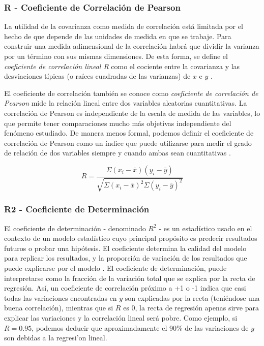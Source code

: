 \subsubsection{R - Coeficiente de Correlación de Pearson}
La utilidad de la covarianza como medida de correlación está limitada por el hecho de que depende de las unidades de medida en que se trabaje. Para construir una medida adimensional de la correlación habrá que dividir la varianza por un término con sus mismas dimensiones. De esta forma, se define el \emph{coeficiente de correlación lineal R} como el cociente entre la covarianza y las desviaciones típicas (o raíces cuadradas de las varianzas) de $x$ e $y$ \cite{estadisticaBasica}. 

El coeficiente de correlación también se conoce como \emph{coeficiente de correlación de Pearson} mide la relación lineal entre dos variables aleatorias cuantitativas. La correlación de Pearson es independiente de la escala de medida de las variables, lo que permite tener comparaciones mucho más objetivas independiente del fenómeno estudiado. De manera menos formal, podemos definir el coeficiente de correlación de Pearson como un índice que puede utilizarse para medir el grado de relación de dos variables siempre y cuando ambas sean cuantitativas \cite{intoStats7}.

\begin{equation}
    R = \frac{\Sigma(x_i - \bar{x})(y_i - \bar{y})}{\sqrt{\Sigma(x_i - \bar{x})^2\Sigma(y_i - \bar{y})^2}}    
\end{equation}

\subsubsection{R2 - Coeficiente de Determinación}
El coeficiente de determinación - denominado \(R^{2}\) - es un estadístico usado en el contexto de un modelo estadístico cuyo principal propósito es predecir resultados futuros o probar una hipótesis. El coeficiente determina la calidad del modelo para replicar los resultados, y la proporción de variación de los resultados que puede explicarse por el modelo \cite{daroczi}. El coeficiente de determinación, puede interpretarse como la fracción de la variación total que se explica por la recta de regresión. Así, un coeficiente de correlación próximo a +1 o -1 indica que casi todas las variaciones encontradas en $y$ son explicadas por la recta (teniéndose una buena correlación), mientras que si $R$ es 0, la recta de regresión apenas sirve para explicar las variaciones y la correlación lineal será pobre. Como ejemplo, si $R = 0.95$, podemos deducir que aproximadamente el 90\% de las variaciones de $y$ son debidas a la regresi'on lineal. 

